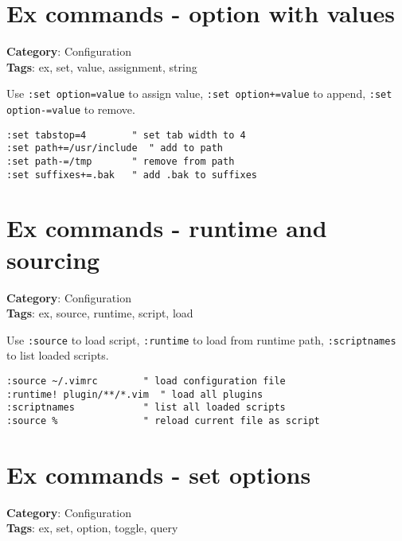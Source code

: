 {{{{\section{Ex commands - option with values}

\textbf{Category}: Configuration\\ \textbf{Tags}: ex, set, value, assignment, string
\vspace{0.5cm}

Use {\footnotesize \Verb§:set option=value§} to assign value, {\footnotesize \Verb§:set option+=value§} to append, {\footnotesize \Verb§:set option-=value§} to remove.

\begin{Exa*}{}
\begin{Verbatim}[fontsize=\footnotesize, breaklines, breakanywhere]
:set tabstop=4        " set tab width to 4
:set path+=/usr/include  " add to path
:set path-=/tmp       " remove from path
:set suffixes+=.bak   " add .bak to suffixes
\end{Verbatim}
\end{Exa*}

\section{Ex commands - runtime and sourcing}

\textbf{Category}: Configuration\\ \textbf{Tags}: ex, source, runtime, script, load
\vspace{0.5cm}

Use {\footnotesize \Verb§:source§} to load script, {\footnotesize \Verb§:runtime§} to load from runtime path, {\footnotesize \Verb§:scriptnames§} to list loaded scripts.

\begin{Exa*}{}
\begin{Verbatim}[fontsize=\footnotesize, breaklines, breakanywhere]
:source ~/.vimrc        " load configuration file
:runtime! plugin/**/*.vim  " load all plugins
:scriptnames            " list all loaded scripts
:source %               " reload current file as script
\end{Verbatim}
\end{Exa*}

\section{Ex commands - set options}

\textbf{Category}: Configuration\\ \textbf{Tags}: ex, set, option, toggle, query
\vspace{0.5cm}

}}}}
